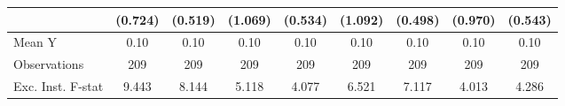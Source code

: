 {\begin{tabular}{l*{8}{c}}
                    &     (0.724)         &     (0.519)         &     (1.069)         &     (0.534)         &     (1.092)         &     (0.498)         &     (0.970)         &     (0.543)         \\
\midrule
Mean Y              &        0.10         &        0.10         &        0.10         &        0.10         &        0.10         &        0.10         &        0.10         &        0.10         \\
Observations        &         209         &         209         &         209         &         209         &         209         &         209         &         209         &         209         \\
Exc. Inst. F-stat   &       9.443         &       8.144         &       5.118         &       4.077         &       6.521         &       7.117         &       4.013         &       4.286         \\
\bottomrule
\end{tabular}
}
